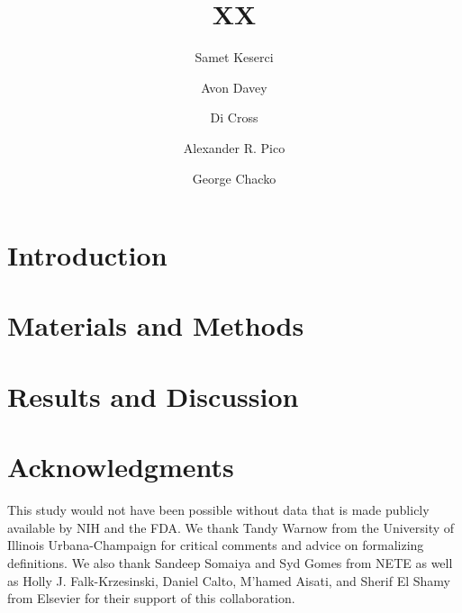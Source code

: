 \documentclass[review]{elsarticle}
\begin{document}
\begin{frontmatter}

\title{XX}

\author[nl]{Samet Keserci}

\author[nl]{Avon Davey}

\author[ca]{Di Cross}

\author[gi]{Alexander R. Pico}

\author[nl]{George Chacko }




\address[nl]{NETE Labs, NET ESolutions Corporation, McLean, VA, USA}
\address[cal]{XX, USA}
\address[gi]{Gladstone Institutes, San Francisco, CA, USA}

\raggedright
\begin{abstract}
\end{abstract}


\end{frontmatter}

\linenumbers
\raggedright
\section{Introduction}

\section{Materials and Methods}

\section*{Results and Discussion} 
\section*{Acknowledgments} This study would not have been possible without data that is made publicly available by NIH and the FDA. We thank Tandy Warnow from the University of Illinois Urbana-Champaign for critical comments and advice on formalizing definitions. We also thank Sandeep Somaiya and Syd Gomes from NETE as well as Holly J. Falk-Krzesinski, Daniel Calto, M'hamed Aisati, and Sherif El Shamy from Elsevier for their support of this collaboration.
\end{document}
